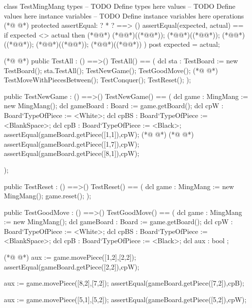 \begin{vdmpp}[breaklines=true]
class TestMingMang
types
-- TODO Define types here
values
-- TODO Define values here
instance variables
-- TODO Define instance variables here
operations
(*@
\label{assertEqual:9}
@*)
protected assertEqual: ? * ? ==> ()
 assertEqual(expected, actual) == 
  if expected <> actual then (*@\vdmnotcovered{(}@*)
    (*@@*)((*@@*));
    (*@@*)((*@@*)); 
    (*@@*)((*@@*));
    (*@@*)((*@@*));
    (*@@*)((*@@*))
  )
 post expected = actual;

(*@
\label{TestAll:20}
@*)
 public TestAll : () ==>()
 TestAll() ==
 (
  dcl sta : TestBoard := new TestBoard();
  sta.TestAll();
  TestNewGame();
  TestGoodMove();
(*@
\label{TestNewGame:27}
@*)
  TestMoveWithPiecesBetween();
  TestConquer();
  TestReset();
 );
 
 public TestNewGame : () ==>()
 TestNewGame() ==
 (
  dcl game : MingMang := new MingMang();
  dcl gameBoard : Board := game.getBoard();
  dcl cpW : Board`TypeOfPiece := <White>;
  dcl cpBS : Board`TypeOfPiece := <BlankSpace>;
  dcl cpB : Board`TypeOfPiece := <Black>;
  assertEqual(gameBoard.getPiece([1,1]),cpW);
(*@
\label{TestGoodMove:41}
@*)
(*@
\label{TestReset:41}
@*)
  assertEqual(gameBoard.getPiece([1,7]),cpW);
  assertEqual(gameBoard.getPiece([8,1]),cpW);
  
 );
 
 public TestReset : () ==>()
 TestReset() ==
 (
  dcl game : MingMang := new MingMang();
  game.reset();
 );
 
 
 public TestGoodMove : () ==>()
 TestGoodMove() ==
 (
  dcl game : MingMang := new MingMang(); 
  dcl gameBoard : Board := game.getBoard();
  dcl cpW : Board`TypeOfPiece := <White>;
  dcl cpBS : Board`TypeOfPiece := <BlankSpace>;
  dcl cpB : Board`TypeOfPiece := <Black>;
  dcl aux : bool ;
  
(*@
\label{TestMoveWithPiecesBetween:64}
@*)
  aux := game.movePiece([1,2],[2,2]);
  assertEqual(gameBoard.getPiece([2,2]),cpW);
  
  aux := game.movePiece([8,2],[7,2]);
  assertEqual(gameBoard.getPiece([7,2]),cpB);
  
  aux := game.movePiece([5,1],[5,2]);
  assertEqual(gameBoard.getPiece([5,2]),cpW);
  

\end{vdmpp}
